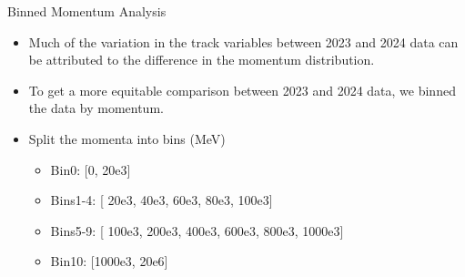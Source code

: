 \begin{frame}{Binned Momentum Analysis}
    \begin{itemize}
        \item Much of the variation in the track variables between 2023 and 2024 data can be attributed to the difference in the momentum distribution.
        \item To get a more equitable comparison between 2023 and 2024 data, we binned the data by momentum.
        \item Split the momenta into bins (MeV)
        \begin{itemize}
            \item Bin0: [0, 20e3]
            \item Bins1-4: [ 20e3, 40e3, 60e3, 80e3, 100e3]
            \item Bins5-9:   [ 100e3, 200e3, 400e3, 600e3, 800e3, 1000e3]
            \item Bin10: [1000e3, 20e6]
        \end{itemize}
    \end{itemize}
\end{frame}

